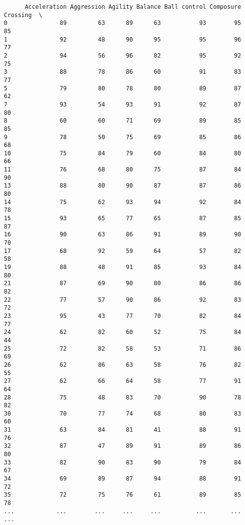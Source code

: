 \documentclass[11pt]{article}
\begin{document}
    
    \begin{verbatim}
      Acceleration Aggression Agility Balance Ball control Composure Crossing  \
0               89         63      89      63           93        95       85   
1               92         48      90      95           95        96       77   
2               94         56      96      82           95        92       75   
3               88         78      86      60           91        83       77   
5               79         80      78      80           89        87       62   
7               93         54      93      91           92        87       80   
8               60         60      71      69           89        85       85   
9               78         50      75      69           85        86       68   
10              75         84      79      60           84        80       66   
11              76         68      80      75           87        84       90   
13              88         80      90      87           87        86       80   
14              75         62      93      94           92        84       78   
15              93         65      77      65           87        85       87   
16              90         63      86      91           89        90       70   
17              68         92      59      64           57        82       58   
19              88         48      91      85           93        84       80   
21              87         69      90      80           86        86       82   
22              77         57      90      86           92        83       72   
23              95         43      77      70           82        84       77   
24              62         82      60      52           75        84       44   
25              72         82      58      53           71        86       69   
26              62         86      63      58           76        82       55   
27              62         66      64      58           77        91       64   
28              75         48      83      70           90        78       82   
30              70         77      74      68           80        83       60   
31              63         84      81      41           88        91       76   
32              87         47      89      91           89        86       80   
33              82         90      83      90           79        84       67   
34              69         89      87      94           88        91       72   
35              72         75      76      61           89        85       78   
...            ...        ...     ...     ...          ...       ...      ...   

\end{verbatim}
\end{document}
